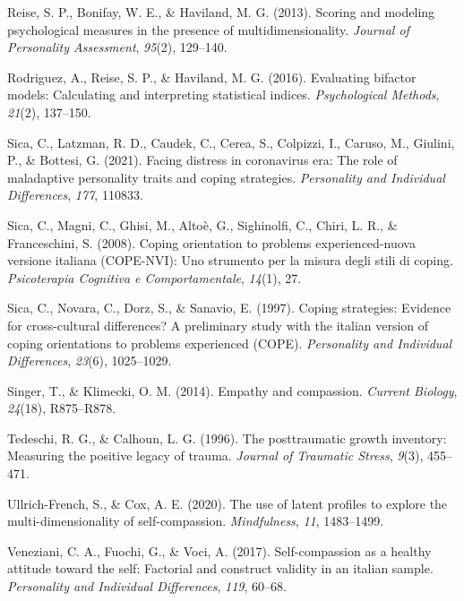 \documentclass[
  man]{apa7}
\newlength{\cslhangindent}
\newlength{\cslentryspacingunit} %
\newenvironment{CSLReferences}[2] %
 {%
  \setlength{\parindent}{0pt}
  \ifodd #1
  \let\oldpar\par
  \def\par{\hangindent=\cslhangindent\oldpar}
  \fi
  \setlength{\parskip}{#2\cslentryspacingunit}
 }%
 {}
\begin{document}
\begin{CSLReferences}{1}{0}
\leavevmode{}%
Reise, S. P., Bonifay, W. E., \& Haviland, M. G. (2013). Scoring and modeling psychological measures in the presence of multidimensionality. \emph{Journal of Personality Assessment}, \emph{95}(2), 129--140.

\leavevmode{}%
Rodriguez, A., Reise, S. P., \& Haviland, M. G. (2016). Evaluating bifactor models: Calculating and interpreting statistical indices. \emph{Psychological Methods}, \emph{21}(2), 137--150.

\leavevmode{}%
Sica, C., Latzman, R. D., Caudek, C., Cerea, S., Colpizzi, I., Caruso, M., Giulini, P., \& Bottesi, G. (2021). Facing distress in coronavirus era: The role of maladaptive personality traits and coping strategies. \emph{Personality and Individual Differences}, \emph{177}, 110833.

\leavevmode{}%
Sica, C., Magni, C., Ghisi, M., Altoè, G., Sighinolfi, C., Chiri, L. R., \& Franceschini, S. (2008). Coping orientation to problems experienced-nuova versione italiana (COPE-NVI): Uno strumento per la misura degli stili di coping. \emph{Psicoterapia Cognitiva e Comportamentale}, \emph{14}(1), 27.

\leavevmode{}%
Sica, C., Novara, C., Dorz, S., \& Sanavio, E. (1997). Coping strategies: Evidence for cross-cultural differences? A preliminary study with the italian version of coping orientations to problems experienced (COPE). \emph{Personality and Individual Differences}, \emph{23}(6), 1025--1029.

\leavevmode{}%
Singer, T., \& Klimecki, O. M. (2014). Empathy and compassion. \emph{Current Biology}, \emph{24}(18), R875--R878.

\leavevmode{}%
Tedeschi, R. G., \& Calhoun, L. G. (1996). The posttraumatic growth inventory: Measuring the positive legacy of trauma. \emph{Journal of Traumatic Stress}, \emph{9}(3), 455--471.

\leavevmode{}%
Ullrich-French, S., \& Cox, A. E. (2020). The use of latent profiles to explore the multi-dimensionality of self-compassion. \emph{Mindfulness}, \emph{11}, 1483--1499.

\leavevmode{}%
Veneziani, C. A., Fuochi, G., \& Voci, A. (2017). Self-compassion as a healthy attitude toward the self: Factorial and construct validity in an italian sample. \emph{Personality and Individual Differences}, \emph{119}, 60--68.


\end{CSLReferences}
\end{document}
